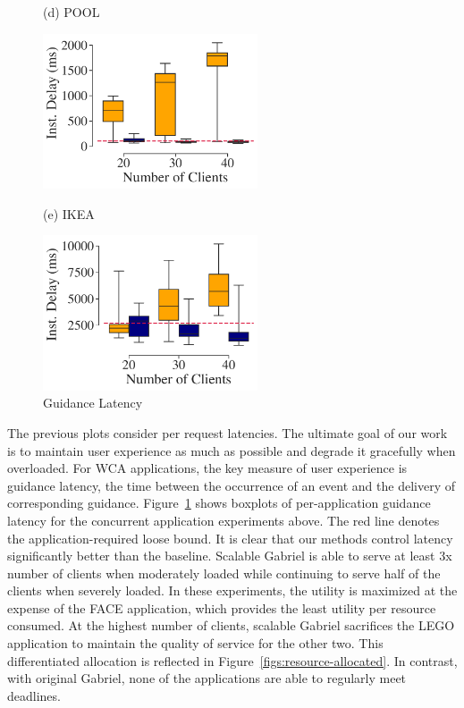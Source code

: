 \begin{figure}[]
\begin{turn}{90}{\hspace{0.6in}\small (d)
POOL}\end{turn}\hspace{0.2in}\includegraphics[width=2.5in, trim=0em 0em 0em 0em,
clip]{FIGS/fig-sec6-latency-pool.pdf}\\[0.08in]
  \vspace{0in}
\begin{turn}{90}{\hspace{0.6in}\small (e) IKEA}\end{turn}\hspace{0.2in}\includegraphics[width=2.5in, trim=0em 0em 0em 0em, clip]{FIGS/fig-sec6-latency-ikea.pdf}
\caption{Guidance Latency}
\label{figs:inst-delay}
\end{figure}
		
The previous plots consider per request latencies. The ultimate goal
of our work is to maintain user experience as much as possible and
degrade it gracefully when overloaded. For WCA applications, the key
measure of user experience is guidance latency, the time between the
occurrence of an event and the delivery of corresponding guidance.
Figure~\ref{figs:inst-delay} shows boxplots of per-application
guidance latency for the concurrent application experiments above. The
red line denotes the application-required loose bound. It is clear
that our methods control latency significantly better than the
baseline. Scalable Gabriel is able to serve at least 3x number of clients
when moderately loaded while continuing to serve half of the clients
when severely loaded. In these experiments, the utility is maximized
at the expense of the FACE application, which provides the least
utility per resource consumed. At the highest number of clients, scalable
Gabriel sacrifices the LEGO application to maintain the quality of service for
the other two. This differentiated allocation is reflected in
Figure~\ref{figs:resource-allocated}. In contrast, with original Gabriel,
none of the applications are able to regularly meet deadlines.

\clearpage